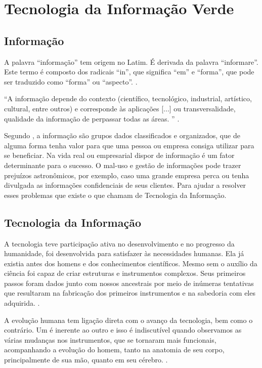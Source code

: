 %
%

\chapter{Tecnologia da Informação Verde}

\section{Informação}

A palavra “informação” tem origem no Latim. É derivada da palavra “informare”. Este termo é composto dos radicais “in”, que significa “em” e “forma”, que pode ser traduzido como “forma” ou “aspecto”. \cite{gramatica2017}.

“A informação depende do contexto (científico, tecnológico, industrial, artístico, cultural, entre outros) e corresponde às aplicações [...] ou transversalidade, qualidade da informação de perpassar todas as áreas. ” \cite{pinheiro2004informaccao}.

Segundo , a informação são grupos dados classificados e organizados, que de alguma forma tenha valor para que uma pessoa ou empresa consiga utilizar para se beneficiar. Na vida real ou empresarial dispor de informação é um fator determinante para o sucesso. O mal-uso e gestão de informações pode trazer prejuízos astronômicos, por exemplo, caso uma grande empresa perca ou tenha divulgada as informações confidenciais de seus clientes. Para ajudar a resolver esses problemas que existe o que chamam de Tecnologia da Informação.

\section{Tecnologia da Informação}

A tecnologia teve participação ativa no desenvolvimento e no progresso da humanidade, foi desenvolvida para satisfazer às necessidades humanas. Ela já existia antes dos homens e dos conhecimentos científicos. Mesmo sem o auxílio da ciência foi capaz de criar estruturas e instrumentos complexos. Seus primeiros passos foram dados junto com nossos ancestrais por meio de inúmeras tentativas que resultaram na fabricação dos primeiros instrumentos e na sabedoria com eles adquirida. \cite{acevedo1998ciencia, veraszto2004projeto}.

A evolução humana tem ligação direta com o avanço da tecnologia, bem como o contrário. Um é inerente ao outro e isso é indiscutível quando observamos as várias mudanças nos instrumentos, que se tornaram mais funcionais, acompanhando a evolução do homem, tanto na anatomia de seu corpo, principalmente de sua mão, quanto em seu cérebro. \cite[p. 107-111]{acevedo1998ciencia}.

